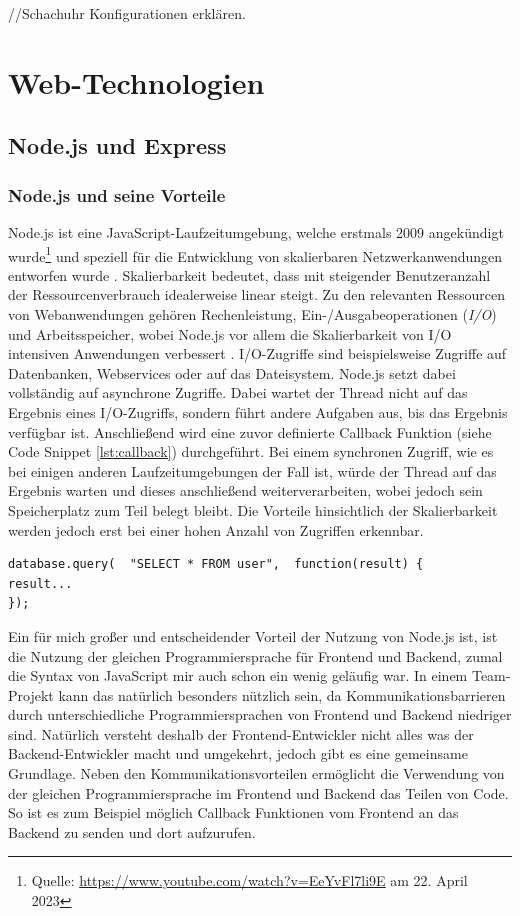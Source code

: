 \documentclass[a4paper,12pt]{report}
\begin{document}
   //Schachuhr Konfigurationen erklären.
    \section{Web-Technologien}
        \subsection{Node.js und Express}
        \subsubsection{Node.js und seine Vorteile}
        \label{sec:node.js}
Node.js ist eine JavaScript-Laufzeitumgebung, welche erstmals 2009 angekündigt wurde\footnote{Quelle: \url{https://www.youtube.com/watch?v=EeYvFl7li9E} am 22. April 2023} und speziell für die Entwicklung von skalierbaren Netzwerkanwendungen entworfen wurde \cite{nodejs}. Skalierbarkeit bedeutet, dass mit steigender Benutzeranzahl der Ressourcenverbrauch idealerweise linear steigt. Zu den relevanten Ressourcen von Webanwendungen gehören Rechenleistung, Ein-/Ausgabeoperationen (\textit{I/O}) und Arbeitsspeicher, wobei Node.js vor allem die Skalierbarkeit von I/O intensiven Anwendungen verbessert \cite{nodejsbook}.
I/O-Zugriffe sind beispielsweise Zugriffe auf Datenbanken, Webservices oder auf das Dateisystem. Node.js setzt dabei vollständig auf asynchrone Zugriffe. Dabei wartet der Thread nicht auf das Ergebnis eines I/O-Zugriffs, sondern führt andere Aufgaben aus, bis das Ergebnis verfügbar ist. Anschließend wird eine zuvor definierte Callback Funktion (siehe Code Snippet \ref{lst:callback}) durchgeführt. Bei einem synchronen Zugriff, wie es bei einigen anderen Laufzeitumgebungen der Fall ist, würde der Thread auf das Ergebnis warten und dieses anschließend weiterverarbeiten, wobei jedoch sein Speicherplatz zum Teil belegt bleibt. Die Vorteile hinsichtlich der Skalierbarkeit werden jedoch erst bei einer hohen Anzahl von Zugriffen erkennbar.

\begin{lstlisting}[style=codeStyle, caption={Beispiel einer Callback Funktion \textbf{Quelle: } \cite{nodejsbook}}, label={lst:callback}]
database.query(  "SELECT * FROM user",  function(result) {
result...
});
\end{lstlisting}


Ein für mich großer und entscheidender Vorteil der Nutzung von Node.js ist, ist die Nutzung der gleichen Programmiersprache für Frontend und Backend, zumal die Syntax von JavaScript mir auch schon ein wenig geläufig war.
In einem Team-Projekt kann das natürlich besonders nützlich sein, da Kommunikationsbarrieren durch unterschiedliche Programmiersprachen von Frontend und Backend niedriger sind. Natürlich versteht deshalb der Frontend-Entwickler nicht alles was  der Backend-Entwickler macht und umgekehrt, jedoch gibt es eine gemeinsame Grundlage. Neben den Kommunikationsvorteilen ermöglicht die Verwendung von der gleichen Programmiersprache im Frontend und Backend das Teilen von Code. So ist es zum Beispiel möglich Callback Funktionen vom Frontend an das Backend zu senden und dort aufzurufen.
\end{document}
